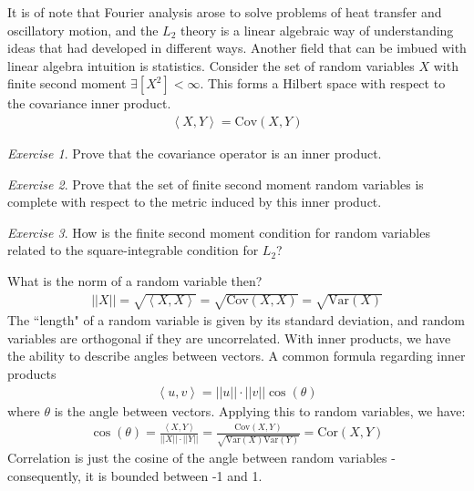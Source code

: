 \documentclass[11pt]{article}
\newcommand{\Var}{\text{Var}}
\newcommand{\Cov}{\text{Cov}}
\newcommand{\E}{\exists}
\newcommand{\ip}[2]{\left\langle #1, #2\right\rangle}
\theoremstyle{plain}
\theoremstyle{definition}
\theoremstyle{remark}
\newtheorem{exc}{Exercise}[section]
\begin{document}
It is of note that Fourier analysis arose to solve problems of heat transfer and oscillatory motion, and the $L_2$ theory is a linear algebraic way of understanding ideas that had developed in different ways. Another field that can be imbued with linear algebra intuition is statistics. Consider the set of random variables $X$ with finite second moment $\E[X^2] < \infty$. This forms a Hilbert space with respect to the covariance inner product.
\begin{align*}
    \ip{X}{Y} = \Cov(X,Y)
\end{align*}
\begin{exc}
    Prove that the covariance operator is an inner product.
\end{exc}
\begin{exc}
    Prove that the set of finite second moment random variables is complete with respect to the metric induced by this inner product.
\end{exc}
\begin{exc}
    How is the finite second moment condition for random variables related to the square-integrable condition for $L_2$?
\end{exc}
What is the norm of a random variable then?
\begin{align*}
    ||X|| = \sqrt{\ip{X}{X}} = \sqrt{\Cov(X,X)} = \sqrt{\Var(X)}
\end{align*}
The ``length" of a random variable is given by its standard deviation, and random variables are orthogonal if they are uncorrelated. With inner products, we have the ability to describe angles between vectors. A common formula regarding inner products
\begin{align*}
    \ip{u}{v} = ||u|| \cdot ||v|| \cos(\theta)
\end{align*}
where $\theta$ is the angle between vectors. Applying this to random variables, we have:
\begin{align*}
    \cos(\theta) = \frac{\ip{X}{Y}}{||X|| \cdot ||Y||} = \frac{\Cov(X,Y)}{\sqrt{\Var(X) \Var(Y)}} = \text{Cor}(X, Y)
\end{align*}
Correlation is just the cosine of the angle between random variables - consequently, it is bounded between -1 and 1.
\end{document}
